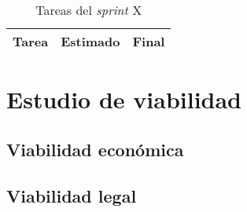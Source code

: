 \begin{table}[H]
	\begin{tabularx}{\linewidth}{X r r}
		\toprule \textbf{Tarea} & \textbf{Estimado} & \textbf{Final}\\
		\toprule
		\bottomrule
	\end{tabularx}
	\caption{Tareas del \textit{sprint} X}
	\label{tab:sprintx}
\end{table}


\section{Estudio de viabilidad}

\subsection{Viabilidad económica}

\subsection{Viabilidad legal}


